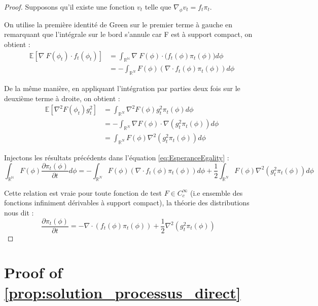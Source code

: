 \documentclass[a4paper,10pt]{article}
\theoremstyle{definition} %
\theoremstyle{definition} %
\theoremstyle{definition} %
\theoremstyle{definition} %
\newcommand{\E}[1]{\mathbb{E}\left[#1\right]}
\newcommand{\R}{\mathbb{R}}
\begin{document}
\begin{proof}
Supposons qu'il existe une fonction $v_t$ telle que $\nabla_{\phi} v_t = f_t \pi_t$.

On utilise la première identité de Green sur le premier terme à gauche en remarquant que l'intégrale sur le bord s'annule car F est à support compact, on obtient :
\begin{align*}
    \E{\nabla\ F(\phi_t)\cdot f_t(\phi_t)}  &=\int_{\mathbb{R^N}} \nabla\ F(\phi)\cdot \big(f_t(\phi) \pi_t(\phi) \bigr)d\phi \\
    &= - \int_{\mathbb{R}^N}F(\phi) (\nabla \cdot f_t(\phi)\pi_t(\phi))d\phi
\end{align*}

De la même manière, en appliquant l'intégration par parties deux fois sur le deuxième terme à droite, on obtient :
\begin{align*}
    \E{\nabla^2 F(\phi_t) g_t^2} &= \int_{\mathbb{R}^N } \nabla^2 F(\phi) g_t^2 \pi_t(\phi)d\phi\\
    &= -\int_{\R^N}\nabla F(\phi) \cdot\nabla(g_t^2\pi_t(\phi)) d\phi\\
    &= \int_{\mathbb{R}^N } F(\phi) \nabla^2(g_t^2 \pi_t(\phi)) d\phi
\end{align*}

Injectons les résultats précédents dans l'équation \eqref{eq:EsperanceEgality} :
\[\int_{\mathbb{R^N}}F(\phi)\frac{\partial\pi_t(\phi)}{\partial t} d\phi = - \int_{\mathbb{R}^N}F(\phi) (\nabla \cdot f_t(\phi)\pi_t(\phi))d\phi + \frac{1}{2}\int_{\mathbb{R}^N } F(\phi) \nabla^2(g_t^2 \pi_t(\phi)) d\phi\]

Cette relation est vraie pour toute fonction de test $F \in C_c^{\infty}$ (i.e ensemble des fonctions infiniment dérivables à support compact), la théorie des distributions nous dit : 
\[\frac{\partial\pi_t(\phi)}{\partial t} = -\nabla \cdot (f_t(\phi)\pi_t(\phi)) + \frac{1}{2}\nabla^2(g_t^2 \pi_t(\phi)) \quad \] 
\end{proof}

\section{Proof of \cref{prop:solution_processus_direct}} \label{sec:proof_solution_processus_direct}
\end{document}
